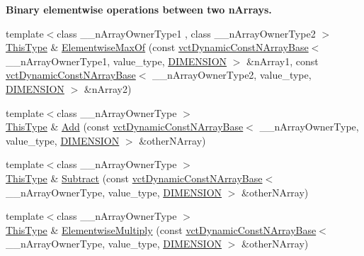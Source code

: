 \begin{Indent}{\bf Binary elementwise operations between two n\-Arrays.}
\begin{DoxyCompactItemize}
\item 
{\footnotesize template$<$class \-\_\-\-\_\-n\-Array\-Owner\-Type1 , class \-\_\-\-\_\-n\-Array\-Owner\-Type2 $>$ }\\\hyperlink{classvct_dynamic_const_n_array_base_a5123caffcf1455a1b99003877eade897}{This\-Type} \& \hyperlink{classvct_dynamic_n_array_base_a826cf1c9b042aeecf4f4294a48130819}{Elementwise\-Max\-Of} (const \hyperlink{classvct_dynamic_const_n_array_base}{vct\-Dynamic\-Const\-N\-Array\-Base}$<$ \-\_\-\-\_\-n\-Array\-Owner\-Type1, value\-\_\-type, \hyperlink{classvct_dynamic_n_array_base_aa66532d28588bdf26d08fb593db815d6abfcde386ec801b212d7c42d63a4f3837}{D\-I\-M\-E\-N\-S\-I\-O\-N} $>$ \&n\-Array1, const \hyperlink{classvct_dynamic_const_n_array_base}{vct\-Dynamic\-Const\-N\-Array\-Base}$<$ \-\_\-\-\_\-n\-Array\-Owner\-Type2, value\-\_\-type, \hyperlink{classvct_dynamic_n_array_base_aa66532d28588bdf26d08fb593db815d6abfcde386ec801b212d7c42d63a4f3837}{D\-I\-M\-E\-N\-S\-I\-O\-N} $>$ \&n\-Array2)
\item 
{\footnotesize template$<$class \-\_\-\-\_\-n\-Array\-Owner\-Type $>$ }\\\hyperlink{classvct_dynamic_const_n_array_base_a5123caffcf1455a1b99003877eade897}{This\-Type} \& \hyperlink{classvct_dynamic_n_array_base_a3b5417da66f0818cc8ce585d7e5aa351}{Add} (const \hyperlink{classvct_dynamic_const_n_array_base}{vct\-Dynamic\-Const\-N\-Array\-Base}$<$ \-\_\-\-\_\-n\-Array\-Owner\-Type, value\-\_\-type, \hyperlink{classvct_dynamic_n_array_base_aa66532d28588bdf26d08fb593db815d6abfcde386ec801b212d7c42d63a4f3837}{D\-I\-M\-E\-N\-S\-I\-O\-N} $>$ \&other\-N\-Array)
\item 
{\footnotesize template$<$class \-\_\-\-\_\-n\-Array\-Owner\-Type $>$ }\\\hyperlink{classvct_dynamic_const_n_array_base_a5123caffcf1455a1b99003877eade897}{This\-Type} \& \hyperlink{classvct_dynamic_n_array_base_ab66a869507b8168c7c74c5524a736e29}{Subtract} (const \hyperlink{classvct_dynamic_const_n_array_base}{vct\-Dynamic\-Const\-N\-Array\-Base}$<$ \-\_\-\-\_\-n\-Array\-Owner\-Type, value\-\_\-type, \hyperlink{classvct_dynamic_n_array_base_aa66532d28588bdf26d08fb593db815d6abfcde386ec801b212d7c42d63a4f3837}{D\-I\-M\-E\-N\-S\-I\-O\-N} $>$ \&other\-N\-Array)
\item 
{\footnotesize template$<$class \-\_\-\-\_\-n\-Array\-Owner\-Type $>$ }\\\hyperlink{classvct_dynamic_const_n_array_base_a5123caffcf1455a1b99003877eade897}{This\-Type} \& \hyperlink{classvct_dynamic_n_array_base_af2c3d2a597e225ecb0a9d1be15cdf141}{Elementwise\-Multiply} (const \hyperlink{classvct_dynamic_const_n_array_base}{vct\-Dynamic\-Const\-N\-Array\-Base}$<$ \-\_\-\-\_\-n\-Array\-Owner\-Type, value\-\_\-type, \hyperlink{classvct_dynamic_n_array_base_aa66532d28588bdf26d08fb593db815d6abfcde386ec801b212d7c42d63a4f3837}{D\-I\-M\-E\-N\-S\-I\-O\-N} $>$ \&other\-N\-Array)

\end{DoxyCompactItemize}
\end{Indent}
